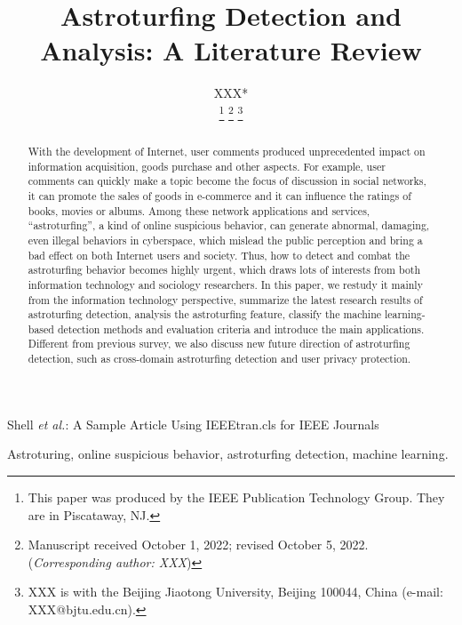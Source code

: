 \documentclass[lettersize,journal]{IEEEtran}
\begin{document}
\title{Astroturfing Detection and Analysis: A Literature Review}

\author{
XXX*

\thanks{This paper was produced by the IEEE Publication Technology Group. They are in Piscataway, NJ.}%
\thanks{Manuscript received October 1, 2022; revised October 5, 2022.
(\emph{Corresponding author: XXX})
}
\thanks{XXX is with the Beijing Jiaotong University, Beijing 100044, China (e-mail: XXX@bjtu.edu.cn).}
}



%
{Shell \MakeLowercase{\textit{et al.}}: A Sample Article Using IEEEtran.cls for IEEE Journals}

\maketitle

\begin{abstract}
With the development of Internet, user comments produced unprecedented impact on information acquisition, goods purchase and other aspects. For example, user comments can quickly make a topic become the focus of discussion in social networks, it can promote the sales of goods in e-commerce and it can influence the ratings of books, movies or albums. Among these network applications and services, “astroturfing”, a kind of online suspicious behavior, can generate abnormal, damaging, even illegal behaviors in cyberspace, which mislead the public perception and bring a bad effect on both Internet users and society. Thus, how to detect and combat the astroturfing behavior becomes highly urgent, which draws lots of interests from both information technology and sociology researchers. In this paper, we restudy it mainly from the information technology perspective, summarize the latest research results of astroturfing detection, analysis the astroturfing feature, classify the machine learning-based detection methods and evaluation criteria and introduce the main applications. Different from previous survey, we also discuss new future direction of astroturfing detection, such as cross-domain astroturfing detection and user privacy protection.
\end{abstract}

\begin{IEEEkeywords}
Astroturing, online suspicious behavior, astroturfing detection, machine learning.
\end{IEEEkeywords}
\end{document}
